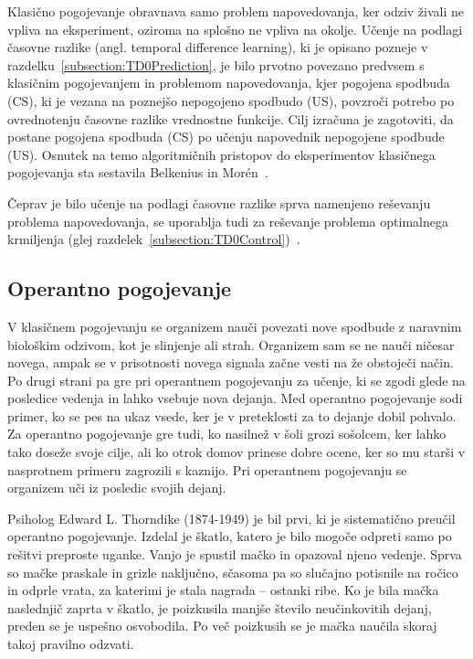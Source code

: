 \documentclass[a4paper, oneside, 12pt]{report}
\begin{document}
Klasično pogojevanje obravnava samo problem napovedovanja, ker odziv živali ne vpliva na eksperiment, oziroma na splošno ne vpliva na okolje. Učenje na podlagi časovne razlike (angl. temporal difference learning), ki je opisano pozneje v razdelku~\ref{subsection:TD0Prediction}, je bilo prvotno povezano predvsem s klasičnim pogojevanjem in problemom napovedovanja, kjer pogojena spodbuda (CS), ki je vezana na poznejšo nepogojeno spodbudo (US), povzroči potrebo po ovrednotenju časovne razlike vrednostne funkcije. Cilj izračuna je zagotoviti, da postane pogojena spodbuda (CS) po učenju napovednik nepogojene spodbude (US). Osnutek na temo algoritmičnih pristopov do eksperimentov klasičnega pogojevanja sta sestavila Belkenius in Morén~\cite{ComputationalModelsOfClassicalConditioningAComparativeStudy}.

Čeprav je bilo učenje na podlagi časovne razlike sprva namenjeno reševanju problema napovedovanja, se uporablja tudi za reševanje problema optimalnega krmiljenja (glej razdelek~\ref{subsection:TD0Control})~\cite{ReinforcementLearningAnIntroduction}. %

\subsection{Operantno pogojevanje}
V klasičnem pogojevanju se organizem nauči povezati nove spodbude z naravnim biološkim odzivom, kot je slinjenje ali strah. Organizem sam se ne nauči ničesar novega, ampak se v prisotnosti novega signala začne vesti na že obstoječi način. Po drugi strani pa gre pri operantnem pogojevanju za učenje, ki se zgodi glede na posledice vedenja in lahko vsebuje nova dejanja. Med operantno pogojevanje sodi primer, ko se pes na ukaz vsede, ker je v preteklosti za to dejanje dobil pohvalo. Za operantno pogojevanje gre tudi, ko nasilnež v šoli grozi sošolcem, ker lahko tako doseže svoje cilje, ali ko otrok domov prinese dobre ocene, ker so mu starši v nasprotnem primeru zagrozili s kaznijo. Pri operantnem pogojevanju se organizem uči iz posledic svojih dejanj.

Psiholog Edward L. Thorndike (1874-1949) je bil prvi, ki je sistematično preučil operantno pogojevanje. Izdelal je škatlo, katero je bilo mogoče odpreti samo po rešitvi preproste uganke. Vanjo je spustil mačko in opazoval njeno vedenje. Sprva so mačke praskale in grizle naključno, sčasoma pa so slučajno potisnile na ročico in odprle vrata, za katerimi je stala nagrada -- ostanki ribe. Ko je bila mačka naslednjič zaprta v škatlo, je poizkusila manjše število neučinkovitih dejanj, preden se je uspešno osvobodila. Po več poizkusih se je mačka naučila skoraj takoj pravilno odzvati.~\cite{AnimalIntelligence1}
\end{document}
